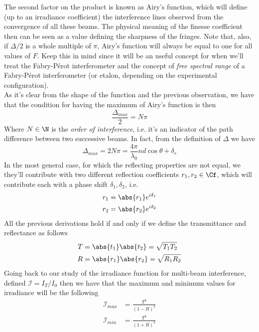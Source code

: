 \documentclass[../electromagnetism.tex]{subfiles}
\begin{document}
The second factor on the product is known as Airy's function, which will define (up to an irradiance coefficient) the interference lines observed from the convergence of all these beams. The physical meaning of the finesse coefficient then can be seen as a value defining the sharpness of the fringes. Note that, also, if $\Delta/2$ is a whole multiple of $\pi$, Airy's function will always be equal to one for all values of $F$. Keep this in mind since it will be an useful concept for when we'll treat the Fabry-Pérot interferometer and the concept of \emph{free spectral range} of a Fabry-Pérot interferometer (or etalon, depending on the experimental configuration).\\
As it's clear from the shape of the function and the previous observation, we have that the condition for having the maximum of Airy's function is then
\begin{equation*}
	\frac{\Delta_{max}}{2}=N\pi
\end{equation*}
Where $N\in\N$ is the \emph{order of interference}, i.e. it's an indicator of the path difference between two successive beams. In fact, from the definition of $\Delta$ we have
\begin{equation}
	\Delta_{max}=2N\pi=\frac{4\pi}{\lambda_0}nd\cos\theta+\delta_r
	\label{eq:maxdeltafabryperot}
\end{equation}
In the most general case, for which the reflecting properties are not equal, we they'll contribute with two different reflection coefficients $r_1,r_2\in\Cf$, which will contribute each with a phase shift $\delta_1,\delta_2$, i.e.
\begin{equation}
	\begin{aligned}
		r_1&= \abs{r_1}e^{i\delta_1}\\
		r_2&= \abs{r_2}e^{i\delta_2}
	\end{aligned}
\end{equation}
All the previous derivations hold if and only if we define the transmittance and reflectance as follows
\begin{equation}
	\begin{aligned}
		T&= \abs{t_1}\abs{t_2}=\sqrt{T_1T_2}\\
		R&= \abs{r_1}\abs{r_2}=\sqrt{R_1R_2}
	\end{aligned}
\end{equation}
Going back to our study of the irradiance function for multi-beam interference, defined $\mathcal{I}=I_T/I_0$ then we have that the maximum and minimum values for irradiance will be the following
\begin{equation}
	\begin{aligned}
		\mathcal{I}_{max}&= \frac{T^2}{(1-R)^2}\\
		\mathcal{I}_{min}&= \frac{T^2}{(1+R)^2}
	\end{aligned}
	\label{eq:maxminweighpow}
\end{equation}
\end{document}
